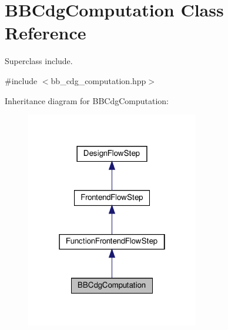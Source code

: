\hypertarget{classBBCdgComputation}{}\section{B\+B\+Cdg\+Computation Class Reference}
\label{classBBCdgComputation}


Superclass include.  




{\ttfamily \#include $<$bb\+\_\+cdg\+\_\+computation.\+hpp$>$}



Inheritance diagram for B\+B\+Cdg\+Computation\+:
\nopagebreak
\begin{figure}[H]
\begin{center}
\leavevmode
\includegraphics[width=214pt]{d5/d6f/classBBCdgComputation__inherit__graph}
\end{center}
\end{figure}


